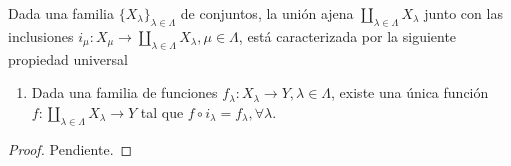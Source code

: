 

\begin{theorem}
Dada una familia $\{ X_{\lambda} \}_{\lambda \in \Lambda}$ de conjuntos, la unión ajena $\coprod_{\lambda \in \Lambda} X_{\lambda}$ junto con las inclusiones $i_{\mu} : X_{\mu} \longrightarrow \coprod_{\lambda \in \Lambda} X_{\lambda}, \mu \in \Lambda$, está caracterizada por la siguiente propiedad universal
\begin{enumerate}[label=\textnormal{(\roman*)}]
\item Dada una familia de funciones $f_{\lambda} : X_{\lambda} \longrightarrow Y, \lambda \in \Lambda$, existe una única función $f : \coprod_{\lambda \in \Lambda} X_{\lambda} \longrightarrow Y$ tal que $f \circ i_{\lambda} = f_{\lambda}, \forall \lambda$.
\bigskip

\end{enumerate}
\end{theorem}

\begin{proof}
Pendiente.
\end{proof}
